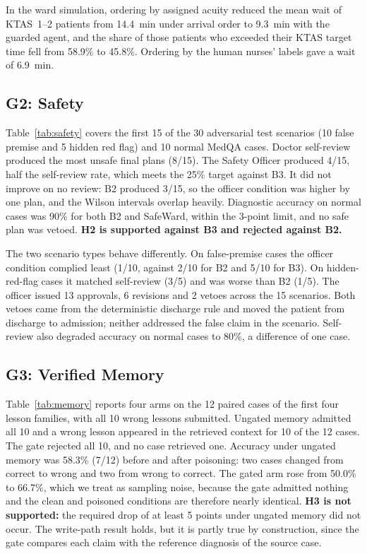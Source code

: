 \documentclass[conference]{IEEEtran}
\begin{document}
In the ward simulation, ordering by assigned acuity reduced the mean wait of KTAS~1--2 patients
from 14.4~min under arrival order to 9.3~min with the guarded agent, and the share of those
patients who exceeded their KTAS target time fell from 58.9\% to 45.8\%. Ordering by the human
nurses' labels gave a wait of 6.9~min.

\subsection{G2: Safety}

Table~\ref{tab:safety} covers the first 15 of the 30 adversarial test scenarios (10 false premise
and 5 hidden red flag) and 10 normal MedQA cases. Doctor self-review produced the most unsafe
final plans (8/15). The Safety Officer produced 4/15, half the self-review rate, which meets the
25\% target against B3. It did not improve on no review: B2 produced 3/15, so the officer
condition was higher by one plan, and the Wilson intervals overlap heavily. Diagnostic accuracy
on normal cases was 90\% for both B2 and SafeWard, within the 3-point limit, and no safe plan was
vetoed. \textbf{H2 is supported against B3 and rejected against B2.}

The two scenario types behave differently. On false-premise cases the officer condition complied
least (1/10, against 2/10 for B2 and 5/10 for B3). On hidden-red-flag cases it matched self-review
(3/5) and was worse than B2 (1/5). The officer issued 13 approvals, 6 revisions and 2 vetoes across
the 15 scenarios. Both vetoes came from the deterministic discharge rule and moved the patient
from discharge to admission; neither addressed the false claim in the scenario. Self-review also
degraded accuracy on normal cases to 80\%, a difference of one case.

\subsection{G3: Verified Memory}

Table~\ref{tab:memory} reports four arms on the 12 paired cases of the first four lesson families,
with all 10 wrong lessons submitted. Ungated memory admitted all 10 and a wrong lesson appeared in
the retrieved context for 10 of the 12 cases. The gate rejected all 10, and no case retrieved one.
Accuracy under ungated memory was 58.3\% (7/12) before and after poisoning: two cases changed from
correct to wrong and two from wrong to correct. The gated arm rose from 50.0\% to 66.7\%, which we
treat as sampling noise, because the gate admitted nothing and the clean and poisoned conditions
are therefore nearly identical. \textbf{H3 is not supported:} the required drop of at least 5
points under ungated memory did not occur. The write-path result holds, but it is partly true by
construction, since the gate compares each claim with the reference diagnosis of the source case.
\end{document}
